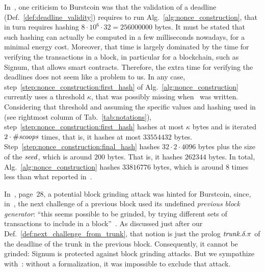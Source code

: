 In~\cite{ParkKFGAP18}, one criticism to Burstcoin was that the validation of a deadline
(Def.~\ref{def:deadline_validity}) requires to run
Alg.~\ref{alg:nonce_construction}, that in turn
requires hashing $8\cdot 10^6\cdot 32=256000000$ bytes.
It must be stated that
such hashing can actually be computed in a few milliseconds nowadays,
for a minimal energy cost. Moreover, that time is largely dominated
by the time for verifying the transactions in a block, in particular
for a blockchain, such as Signum, that allows smart contracts.
Therefore, the extra time for verifying the deadlines does not seem like a problem to us.
In any case, step~\ref{step:nonce_construction:first_hash} of
Alg.~\ref{alg:nonce_construction} currently uses a threshold $\kappa$,
that was possibly missing when~\cite{ParkKFGAP18} was written.
Considering that threshold and assuming the specific values and hashing
used in~\cite{SignumPlotting} (see rightmost column of Tab.~\ref{tab:notations}),
step~\ref{step:nonce_construction:first_hash}
hashes at most $\kappa$ bytes and is iterated $2\cdot{\#\mathit{scoops}}$ times, that is,
it hashes at most $33554432$ bytes.
Step~\ref{step:nonce_construction:final_hash} hashes $32\cdot 2\cdot 4096$ bytes
plus the size of the ${\mathit{seed}}$, which is around $200$ bytes.
That is, it hashes $262344$ bytes. In total, Alg.~\ref{alg:nonce_construction}
hashes $33816776$ bytes, which is around $8$ times less than what reported
in~\cite{ParkKFGAP18}.

In~\cite{ParkPAFG15}, page~28, a potential block grinding attack was hinted for Burstcoin,
since, in~\cite{SignumPlotting}, the next challenge of a previous block used its undefined
\emph{previous block generator}:
``this seems possible to be grinded, by trying
different sets of transactions to include in a block''~\cite{ParkPAFG15}.
As discussed just after our Def.~\ref{def:next_challenge_from_trunk}, that notion is
just the prolog ${\mathit{trunk}}.\delta.\pi$ of the deadline of the trunk in the previous block.
Consequently, it cannot be grinded: Signum is protected against block grinding attacks.
But we sympathize with~\cite{ParkPAFG15}: without a formalization,
it was impossible to exclude that attack.

